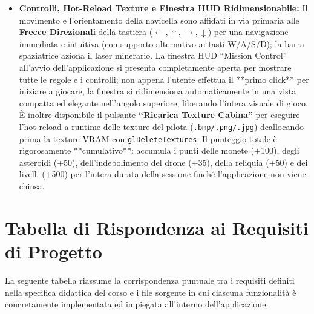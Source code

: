 \documentclass[11pt,a4paper]{article}
\begin{document}
\begin{itemize}
    \item \textbf{Controlli, Hot-Reload Texture e Finestra HUD Ridimensionabile:} Il movimento e l'orientamento della navicella sono affidati in via primaria alle \textbf{Frecce Direzionali} della tastiera ($\leftarrow, \uparrow, \rightarrow, \downarrow$) per una navigazione immediata e intuitiva (con supporto alternativo ai tasti W/A/S/D); la barra spaziatrice aziona il laser minerario. La finestra HUD ``Mission Control'' all'avvio dell'applicazione si presenta completamente aperta per mostrare tutte le regole e i controlli; non appena l'utente effettua il **primo click** per iniziare a giocare, la finestra si ridimensiona automaticamente in una vista compatta ed elegante nell'angolo superiore, liberando l'intera visuale di gioco. È inoltre disponibile il pulsante \textbf{``Ricarica Texture Cabina''} per eseguire l'hot-reload a runtime delle texture del pilota (\texttt{.bmp/.png/.jpg}) deallocando prima la texture VRAM con \texttt{glDeleteTextures}. Il punteggio totale è rigorosamente **cumulativo**: accumula i punti delle monete (+100), degli asteroidi (+50), dell'indebolimento del drone (+35), della reliquia (+50) e dei livelli (+500) per l'intera durata della sessione finché l'applicazione non viene chiusa.
\end{itemize}

\section{Tabella di Rispondenza ai Requisiti di Progetto}

La seguente tabella riassume la corrispondenza puntuale tra i requisiti definiti nella specifica didattica del corso e i file sorgente in cui ciascuna funzionalità è concretamente implementata ed impiegata all'interno dell'applicazione.
\end{document}
